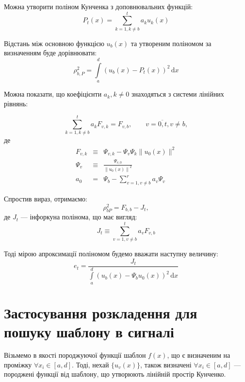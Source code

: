     Можна утворити поліном Кунченка з доповнювальних функцій:
    \begin{equation}
        \label{eq:polynom}
        P_t( x ) = \sum^t_{k = 1, k \ne b} a_k u_k( x  )
    \end{equation}

    Відстань між основною функцією $u_b(x)$ та утвореним поліномом за визначенням буде дорівнювати:
    \begin{equation}
        \rho^2_{b,P} = \int\limits_a^d\left( u_b(x) - P_t(x)\right)^2 \, \mathrm{d}x
    \end{equation}

    Можна показати, що коефіцієнти $a_k, k \ne 0$ знаходяться з системи лінійних рівнянь:

    \begin{equation}
        \label{eq:linear-system}
        \sum^t_{k=1,k\ne b} a_k F_{v,k} = F_{v,b},\qquad v=\overline{0,t}, v \ne b,
    \end{equation}
    де
    \begin{eqnarray}
        \label{eq:centered-correlants}
        F_{v,k} &\equiv& \Psi_{v,k} - \Psi_v \Psi_k \| u_0( x ) \|^2\\
        \Psi_v &\equiv& \frac{\Psi_{v,0}}{\left\|u_0(x)\right\|^2}\\
        a_0 &=& \Psi_b - \sum\limits_{v=1, v \ne b}^r{a_v \Psi_v}
    \end{eqnarray}

    Спростив вираз, отримаємо:
    \begin{equation}
        \rho^2_{bP} = F_{b,b} - J_t,
    \end{equation}
    де $J_t$ --- інфоркуна полінома, що має вигляд:
    \begin{equation}
        J_t \equiv \sum_{v=1,v\ne b}^t a_v F_{v,b}
    \end{equation}

    Тоді мірою апроксимації поліномом будемо вважати наступну величину:
    \begin{equation}
        \label{eq:et}
        e_t = \frac{J_t}{\int\limits_a^d (u_b(x)-\Psi_b u_0( x ))^2\, \mathrm{d}x}
    \end{equation}

\section{Застосування розкладення для пошуку шаблону в сигналі}
    Візьмемо в якості породжуючої функції шаблон $f(x)$, що є визначеним на проміжку $\forall x_i \in {[a, d]}$.
    Тоді, нехай $\{u_v(x)\}$, також визначені $\forall x_i \in {[a, d]}$ --- породжені функції від шаблону, що
    утворюють лінійній простір Кунченко.

